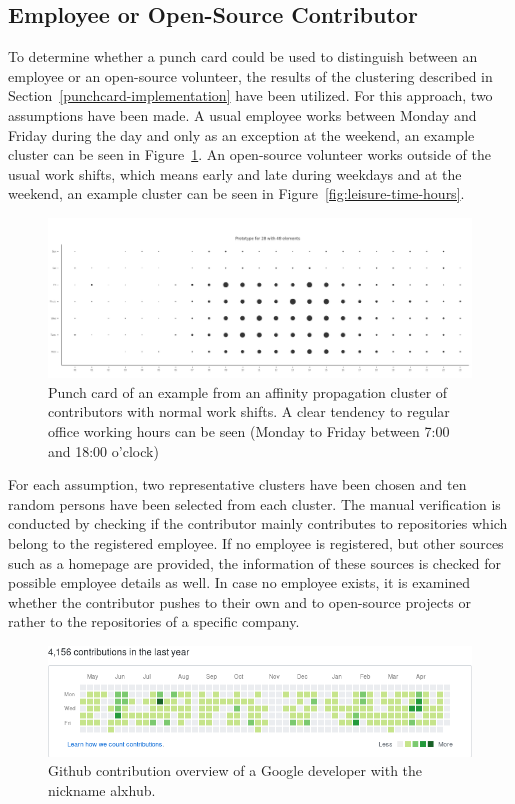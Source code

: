 \subsection{Employee or Open-Source Contributor}
To determine whether a punch card could be used to distinguish between an employee or an open-source volunteer, the results of the clustering described in Section~\ref{punchcard-implementation} have been utilized.
For this approach, two assumptions have been made.
A usual employee works between Monday and Friday during the day and only as an exception at the weekend, an example cluster can be seen in Figure~\ref{fig:normal-office-hours}.
An open-source volunteer works outside of the usual work shifts, which means early and late during weekdays and at the weekend, an example cluster can be seen in Figure~\ref{fig:leisure-time-hours}.

\begin{figure}[H]
    \includegraphics[scale=0.32]{./graphs/analysis-affinity/28}
    \centering
    \caption{Punch card of an example from an affinity propagation cluster of contributors with normal work shifts.
    A clear tendency to regular office working hours can be seen (Monday to Friday between 7:00 and 18:00 o'clock)}\label{fig:normal-office-hours}
\end{figure}

For each assumption, two representative clusters have been chosen and ten random persons have been selected from each cluster.
The manual verification is conducted by checking if the contributor mainly contributes to repositories which belong to the registered employee.
If no employee is registered, but other sources such as a homepage are provided, the information of these sources is checked for possible employee details as well.
In case no employee exists, it is examined whether the contributor pushes to their own and to open-source projects or rather to the repositories of a specific company.

\begin{figure}[H]
    \includegraphics[scale=0.6]{./graphs/contribution-overview-alxhub}
    \centering
    \caption{Github contribution overview of a Google developer with the nickname alxhub.}\label{fig:github-contribution-overview}
\end{figure}

